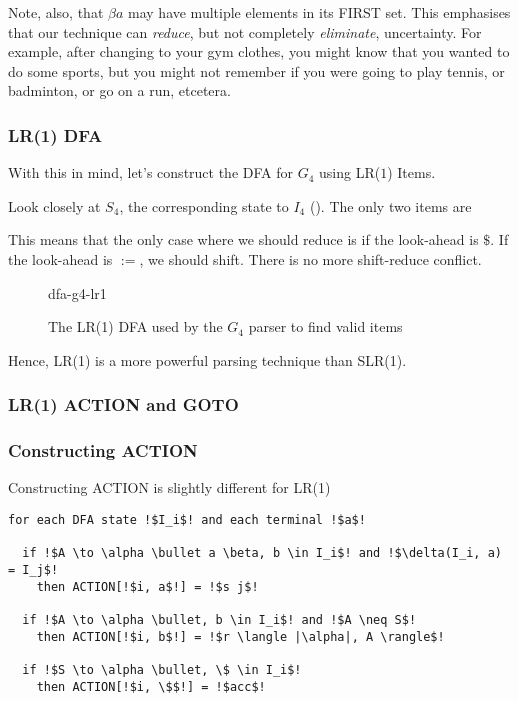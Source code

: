 Note, also, that $\beta a$ may have multiple elements in its FIRST set. This emphasises that our technique can \textit{reduce}, but not completely \textit{eliminate}, uncertainty. For example, after changing to your gym clothes, you might know that you wanted to do some sports, but you might not remember if you were going to play tennis, or badminton, or go on a run, etcetera. 

\subsubsection{LR(1) DFA}
With this in mind, let's construct the DFA for $G_4$ using LR($1$) Items.

Look closely at $S_4$, the corresponding state to $I_4$ (). The only two items are
\begin{center}
\end{center}
This means that the only case where we should reduce is if the look-ahead is $\$$. If the look-ahead is $:=$, we should shift. There is no more shift-reduce conflict.

\begin{figure}
    \centering
    {dfa-g4-lr1}
    \caption{The LR(1) DFA used by the $G_4$ parser to find valid items}
    \label{fig:dfa-g4-lr1}
\end{figure}

Hence, LR(1) is a more powerful parsing technique than SLR(1).

\subsubsection{LR(1) ACTION and GOTO}

\subsubsection{Constructing ACTION}
Constructing ACTION is slightly different for LR(1)

\begin{code}
\begin{lstlisting}[style=pseudocode]
for each DFA state !$I_i$! and each terminal !$a$!

  if !$A \to \alpha \bullet a \beta, b \in I_i$! and !$\delta(I_i, a) = I_j$! 
    then ACTION[!$i, a$!] = !$s j$!
    
  if !$A \to \alpha \bullet, b \in I_i$! and !$A \neq S$! 
    then ACTION[!$i, b$!] = !$r \langle |\alpha|, A \rangle$!
      
  if !$S \to \alpha \bullet, \$ \in I_i$! 
    then ACTION[!$i, \$$!] = !$acc$!
\end{lstlisting}
\vspace{1mm}
\end{code}

